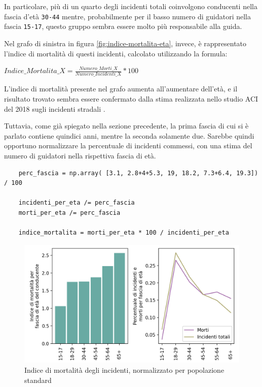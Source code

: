 \documentclass[a4paper]{report}
\newcommand{\columnstyle}[1]{\texttt{#1}}
\begin{document}
In particolare, più di un quarto degli incidenti totali coinvolgono conducenti nella 
fascia d'età \columnstyle{30-44} mentre, probabilmente per il basso numero di 
guidatori nella fascia \columnstyle{15-17}, questo gruppo sembra essere molto 
più responsabile alla guida.

Nel grafo di sinistra in figura \ref{fig:indice-mortalita-eta}, invece, 
è rappresentato l'indice di mortalità di questi incidenti, 
calcolato utilizzando la formula: 

\begin{center}
    $Indice\_Mortalita\_X = \displaystyle \frac{Numero\_Morti\_X}{Numero\_Incidenti\_X} * 100$ 
\end{center}

L'indice di mortalità presente nel grafo aumenta all'aumentare dell'età, 
e il risultato trovato sembra essere confermato dalla stima realizzata nello studio 
ACI del 2018 sugli incidenti stradali \cite{ACI:3}. 

Tuttavia, come già spiegato nella sezione precedente, la prima fascia di cui si è parlato 
contiene quindici anni, mentre la seconda solamente due. Sarebbe quindi opportuno 
normalizzare la percentuale di incidenti commessi, con una stima del numero di 
guidatori nella rispettiva fascia di età.

\begin{lstlisting}
    perc_fascia = np.array( [3.1, 2.8+4+5.3, 19, 18.2, 7.3+6.4, 19.3]) / 100

    incidenti_per_eta /= perc_fascia
    morti_per_eta /= perc_fascia

    indice_mortalita = morti_per_eta * 100 / incidenti_per_eta
\end{lstlisting}

\begin{figure}
    \includegraphics[width=\linewidth]{../src/incidenti/incidenti_senza_coords/mortalita/indice_mort_norm.png}
    \caption{Indice di mortalità degli incidenti, normalizzato per popolazione standard}
    \label{fig:indice-mort-norm}
\end{figure}
\end{document}
